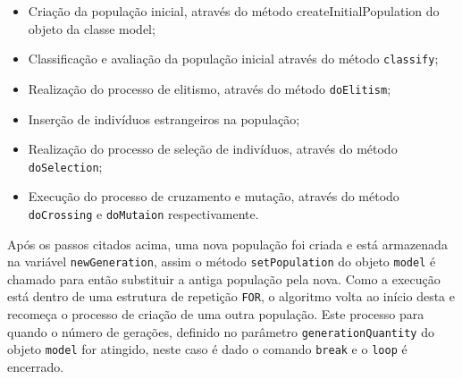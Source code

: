 \begin{itemize}
	\begin{itemize}
		\item	Criação da população inicial, através do método createInitialPopulation
		do objeto da classe model;
		
		\item Classificação e avaliação da população inicial através do método
		\texttt{classify};
		
		\item Realização do processo de elitismo, através do método
		\texttt{doElitism};
		
		\item Inserção de indivíduos estrangeiros na população;
		
		\item Realização do processo de seleção de indivíduos, através do método
		\texttt{doSelection};
		
		\item Execução do processo de cruzamento e mutação, através do método
		\texttt{doCrossing} e \texttt{doMutaion} respectivamente.
		
		
	\end{itemize}
	
	\par Após os passos citados acima, uma nova população foi criada e está
	armazenada na variável \texttt{newGeneration}, assim o método
	\texttt{setPopulation} do objeto \texttt{model} é chamado para então substituir
	a antiga população pela nova. Como a execução está dentro de uma estrutura de repetição
	\texttt{FOR}, o algoritmo volta ao início desta e recomeça o processo de
	criação de uma outra população. Este processo para quando o número de gerações, 
	definido no parâmetro \texttt{generationQuantity} do objeto \texttt{model}
	for atingido, neste caso é dado o comando \texttt{break} e o \texttt{loop} é encerrado.
	
	
	
	
\end{itemize}

